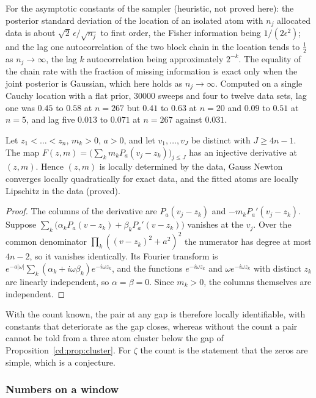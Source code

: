 For the asymptotic constants of the sampler (heuristic, not proved here): the posterior standard deviation of the location of an isolated atom with $n_j$ allocated data is about $\sqrt2\,\epsilon/\sqrt{n_j}$ to first order, the Fisher information being $1/(2\epsilon^2)$; and the lag one autocorrelation of the two block chain in the location tends to $\tfrac12$ as $n_j\to\infty$, the lag $k$ autocorrelation being approximately $2^{-k}$. The equality of the chain rate with the fraction of missing information is exact only when the joint posterior is Gaussian, which here holds as $n_j\to\infty$. Computed on a single Cauchy location with a flat prior, $30000$ sweeps and four to twelve data sets, lag one was $0.45$ to $0.58$ at $n=267$ but $0.41$ to $0.63$ at $n=20$ and $0.09$ to $0.51$ at $n=5$, and lag five $0.013$ to $0.071$ at $n=267$ against $0.031$.

\begin{proposition}\label{cx:prop:atoms}
Let $z_1<\dots<z_n$, $m_k>0$, $a>0$, and let $v_1,\dots,v_J$ be distinct with $J\ge4n-1$. The map $F(z,m)=\bigl(\sum_km_kP_a(v_j-z_k)\bigr)_{j\le J}$ has an injective derivative at $(z,m)$. Hence $(z,m)$ is locally determined by the data, Gauss Newton converges locally quadratically for exact data, and the fitted atoms are locally Lipschitz in the data (proved).
\end{proposition}

\begin{proof}
The columns of the derivative are $P_a(v_j-z_k)$ and $-m_kP_a'(v_j-z_k)$. Suppose $\sum_k\bigl(\alpha_kP_a(v-z_k)+\beta_kP_a'(v-z_k)\bigr)$ vanishes at the $v_j$. Over the common denominator $\prod_k((v-z_k)^2+a^2)^2$ the numerator has degree at most $4n-2$, so it vanishes identically. Its Fourier transform is $e^{-a|\omega|}\sum_k(\alpha_k+i\omega\beta_k)e^{-i\omega z_k}$, and the functions $e^{-i\omega z_k}$ and $\omega e^{-i\omega z_k}$ with distinct $z_k$ are linearly independent, so $\alpha=\beta=0$. Since $m_k>0$, the columns themselves are independent.
\end{proof}

With the count known, the pair at any gap is therefore locally identifiable, with constants that deteriorate as the gap closes, whereas without the count a pair cannot be told from a three atom cluster below the gap of Proposition~\ref{cd:prop:cluster}. For $\zeta$ the count is the statement that the zeros are simple, which is a conjecture.

\subsubsection*{Numbers on a window}

